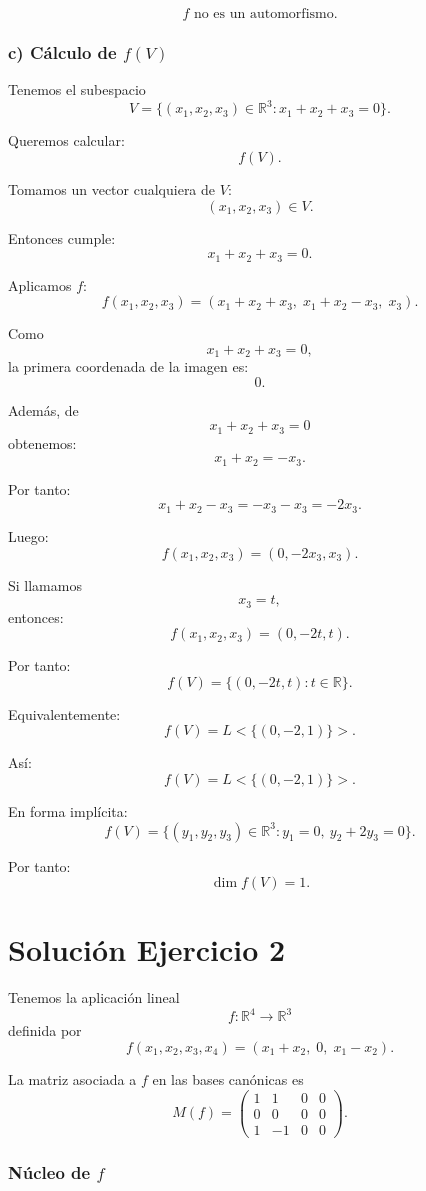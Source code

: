 \documentclass[12pt]{article}
\begin{document}
\[
\boxed{
f \text{ no es un automorfismo.}
}
\]

\subsubsection*{c) Cálculo de \(f(V)\)}

Tenemos el subespacio
\[
V=\{(x_1,x_2,x_3)\in\mathbb{R}^3:x_1+x_2+x_3=0\}.
\]

Queremos calcular:
\[
f(V).
\]

Tomamos un vector cualquiera de \(V\):
\[
(x_1,x_2,x_3)\in V.
\]

Entonces cumple:
\[
x_1+x_2+x_3=0.
\]

Aplicamos \(f\):
\[
f(x_1,x_2,x_3)
=
(x_1+x_2+x_3,\;x_1+x_2-x_3,\;x_3).
\]

Como
\[
x_1+x_2+x_3=0,
\]
la primera coordenada de la imagen es:
\[
0.
\]

Además, de
\[
x_1+x_2+x_3=0
\]
obtenemos:
\[
x_1+x_2=-x_3.
\]

Por tanto:
\[
x_1+x_2-x_3=-x_3-x_3=-2x_3.
\]

Luego:
\[
f(x_1,x_2,x_3)=(0,-2x_3,x_3).
\]

Si llamamos
\[
x_3=t,
\]
entonces:
\[
f(x_1,x_2,x_3)=(0,-2t,t).
\]

Por tanto:
\[
f(V)=\{(0,-2t,t):t\in\mathbb{R}\}.
\]

Equivalentemente:
\[
f(V)=L<\{(0,-2,1)\}>.
\]

Así:
\[
\boxed{
f(V)=L<\{(0,-2,1)\}>.
}
\]

En forma implícita:
\[
\boxed{
f(V)=\{(y_1,y_2,y_3)\in\mathbb{R}^3:y_1=0,\ y_2+2y_3=0\}.
}
\]

Por tanto:
\[
\boxed{\dim f(V)=1.}
\]

\section*{Solución Ejercicio 2}

Tenemos la aplicación lineal
\[
f:\mathbb{R}^4\longrightarrow \mathbb{R}^3
\]
definida por
\[
f(x_1,x_2,x_3,x_4)=(x_1+x_2,\;0,\;x_1-x_2).
\]

La matriz asociada a \(f\) en las bases canónicas es
\[
M(f)=
\begin{pmatrix}
1&1&0&0\\
0&0&0&0\\
1&-1&0&0
\end{pmatrix}.
\]

\subsubsection*{Núcleo de \(f\)}
\end{document}
